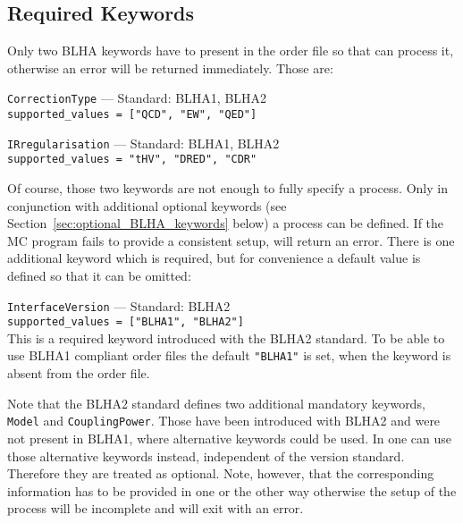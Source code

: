 \lstset{
  breaklines = true,
  breakatwhitespace = true
}

%
%
%

\subsection{Required Keywords}
Only two BLHA keywords have to present in the order file so that \gosam can process it, otherwise an error will be returned immediately. Those are:
\begin{basedescript}{\desclabelstyle{\pushlabel}}
    \item[\hspace{-1em}]\colorbox{gray!30}{\lstinline[style=in]|CorrectionType|} --- Standard: BLHA1, BLHA2\vspace{0.1cm}\\
        \lstinline[style=in]|supported_values = ["QCD", "EW", "QED"]|
    \item[\hspace{-1em}]\colorbox{gray!30}{\lstinline[style=in]|IRregularisation|} --- Standard: BLHA1, BLHA2\vspace{0.1cm}\\
        \lstinline[style=in]|supported_values = "tHV", "DRED", "CDR"|
\end{basedescript}
Of course, those two keywords are not enough to fully specify a process. Only in conjunction with additional optional keywords (see Section~\ref{sec:optional_BLHA_keywords} below) a process can be defined. If the MC program fails to provide a consistent setup, \gosam will return an error. There is one additional keyword which is required, but for convenience a default value is defined so that it can be omitted:
\begin{basedescript}{\desclabelstyle{\pushlabel}}
    \item[\hspace{-1em}]\colorbox{gray!30}{\lstinline[style=in]|InterfaceVersion|} --- Standard: BLHA2\vspace{0.1cm}\\
        \lstinline[style=in]|supported_values = ["BLHA1", "BLHA2"]|\\
        This is a required keyword introduced with the BLHA2 standard. To be able to use BLHA1 compliant order files the default \texttt{"BLHA1"} is set, when the keyword is absent from the order file.
\end{basedescript}
Note that the BLHA2 standard defines two additional mandatory keywords, \texttt{Model} and \texttt{CouplingPower}. Those have been introduced with BLHA2 and were not present in BLHA1, where alternative keywords could be used. In \gosam one can use those alternative keywords instead, independent of the version standard. Therefore they are treated as optional. Note, however, that the corresponding information has to be provided in one or the other way otherwise the setup of the process will be incomplete and \gosam will exit with an error.

